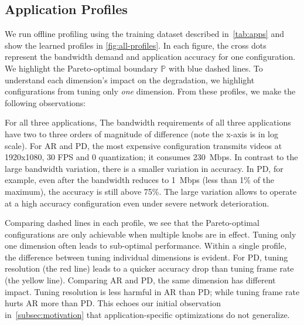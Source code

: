 \subsection{Application Profiles}
\label{sec:application-profiles}

We run offline profiling using the training dataset described
in~\autoref{tab:apps} and show the learned profiles in
\autoref{fig:all-profiles}. In each figure, the cross dots represent the
bandwidth demand and application accuracy for one configuration. We highlight
the Pareto-optimal boundary $\mathbb{P}$ with blue dashed lines. To understand
each dimension's impact on the degradation, we highlight configurations from
tuning only \textit{one} dimension. From these profiles, we make the following
observations:

 For all three applications, The bandwidth
requirements of all three applications have two to three orders of magnitude of
difference (note the x-axis is in log scale). For AR and PD, the most expensive
configuration transmits videos at 1920x1080, 30 FPS and 0 quantization; it
consumes \SI{230}{Mbps}. In contrast to the large bandwidth variation, there is
a smaller variation in accuracy. In PD, for example, even after the bandwidth
reduces to \SI{1}{Mbps} (less than 1\% of the maximum), the accuracy is still
above 75\%. The large variation allows \sysname{} to operate at a high accuracy
configuration even under severe network deterioration.

 Comparing dashed lines in each
profile, we see that the Pareto-optimal configurations are only achievable when
multiple knobs are in effect. Tuning only one dimension often leads to
sub-optimal performance. Within a single profile, the difference between tuning
individual dimensions is evident. For PD, tuning resolution (the red line) leads
to a quicker accuracy drop than tuning frame rate (the yellow line). Comparing
AR and PD, the same dimension has different impact. Tuning resolution is less
harmful in AR than PD; while tuning frame rate hurts AR more than PD\@. This
echoes our initial observation in~\autoref{subsec:motivation} that
application-specific optimizations do not generalize.



